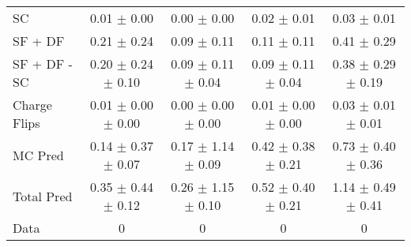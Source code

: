 \begin{tabular}{l|cccc}
                                 SC &  0.01 $\pm$  0.00 &  0.00 $\pm$  0.00 &  0.02 $\pm$  0.01 &  0.03 $\pm$  0.01 \\
                            SF + DF &  0.21 $\pm$  0.24 &  0.09 $\pm$  0.11 &  0.11 $\pm$  0.11 &  0.41 $\pm$  0.29 \\
\hline
                       SF + DF - SC &  0.20 $\pm$  0.24 $\pm$  0.10 &  0.09 $\pm$  0.11 $\pm$  0.04 &  0.09 $\pm$  0.11 $\pm$  0.04 &  0.38 $\pm$  0.29 $\pm$  0.19 \\
\hline\hline
                       Charge Flips &  0.01 $\pm$  0.00 $\pm$  0.00 &  0.00 $\pm$  0.00 $\pm$  0.00 &  0.01 $\pm$  0.00 $\pm$  0.00 &  0.03 $\pm$  0.01 $\pm$  0.01 \\
\hline
                            MC Pred &  0.14 $\pm$  0.37 $\pm$  0.07 &  0.17 $\pm$  1.14 $\pm$  0.09 &  0.42 $\pm$  0.38 $\pm$  0.21 &  0.73 $\pm$  0.40 $\pm$  0.36 \\
\hline
                         Total Pred &  0.35 $\pm$  0.44 $\pm$  0.12 &  0.26 $\pm$  1.15 $\pm$  0.10 &  0.52 $\pm$  0.40 $\pm$  0.21 &  1.14 $\pm$  0.49 $\pm$  0.41 \\
\hline\hline
                               Data &     0 &     0 &     0 &     0 \\
\hline\hline
\end{tabular}

